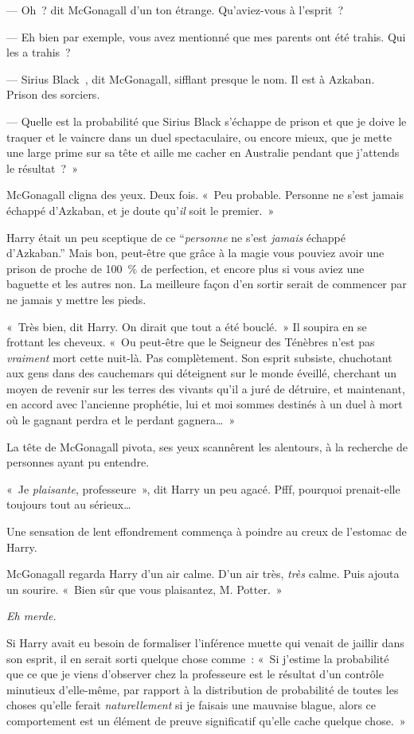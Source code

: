 --- Oh~? dit McGonagall d'un ton étrange. Qu'aviez-vous à l'esprit~?

--- Eh bien par exemple, vous avez mentionné que mes parents ont été trahis. Qui les a trahis~?

--- Sirius Black~, dit McGonagall, sifflant presque le nom. Il est à Azkaban. Prison des sorciers.

--- Quelle est la probabilité que Sirius Black s'échappe de prison et que je doive le traquer et le vaincre dans un duel spectaculaire, ou encore mieux, que je mette une large prime sur sa tête et aille me cacher en Australie pendant que j'attends le résultat~?~»

McGonagall cligna des yeux. Deux fois. «~Peu probable. Personne ne s'est jamais échappé d'Azkaban, et je doute qu'\emph{il} soit le premier.~»

Harry était un peu sceptique de ce “\emph{personne} ne s'est \emph{jamais} échappé d'Azkaban.”
Mais bon, peut-être que grâce à la magie vous pouviez avoir une prison de proche de 100~\% de perfection, et encore plus si vous aviez une baguette et les autres non.
La meilleure façon d'en sortir serait de commencer par ne jamais y mettre les pieds.

«~Très bien, dit Harry. On dirait que tout a été bouclé.~» Il soupira en se frottant les cheveux.
«~Ou peut-être que le Seigneur des Ténèbres n'est pas \emph{vraiment} mort cette nuit-là.  Pas complètement.
Son esprit subsiste, chuchotant aux gens dans des cauchemars qui déteignent sur le monde éveillé, cherchant un moyen de revenir sur les terres des vivants qu'il a juré de détruire, et maintenant, en accord avec l'ancienne prophétie, lui et moi sommes destinés à un duel à mort où le gagnant perdra et le perdant gagnera…~»

La tête de McGonagall pivota, ses yeux scannêrent les alentours, à la recherche de personnes ayant pu entendre.

«~Je \emph{plaisante}, professeure~», dit Harry un peu agacé. Pfff, pourquoi prenait-elle toujours tout au sérieux…

Une sensation de lent effondrement commença à poindre au creux de l'estomac de Harry.

McGonagall regarda Harry d'un air calme. D'un air très, \emph{très} calme. Puis ajouta un sourire. «~Bien sûr que vous plaisantez, M. Potter.~»

\emph{Eh merde.}

Si Harry avait eu besoin de formaliser l'inférence muette qui venait de jaillir dans son esprit, il en serait sorti quelque chose comme~:
«~Si j'estime la probabilité que ce que je viens d'observer chez la professeure est le résultat d'un contrôle minutieux d'elle-même, par rapport à la distribution de probabilité de toutes les choses qu'elle ferait \emph{naturellement} si je faisais une mauvaise blague, alors ce comportement est un élément de preuve significatif qu'elle cache quelque chose.~»

